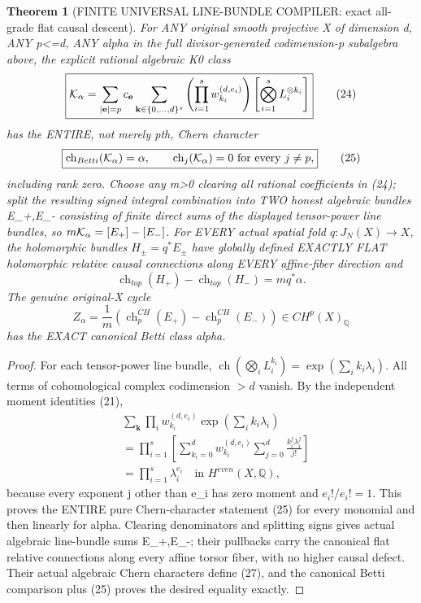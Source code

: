 \documentclass[11pt]{article}
\newtheorem{theorem}{Theorem}
\begin{document}
\begin{theorem}[FINITE UNIVERSAL LINE-BUNDLE COMPILER: exact all-grade flat causal descent]
For ANY original smooth projective X
of dimension d, ANY p<=d, ANY
alpha in the full divisor-generated
codimension-p subalgebra above,
the explicit rational algebraic K0
class
\[
 \boxed{
 {\cal K}_\alpha
 =\sum_{|\mathbf e|=p}
 c_{\mathbf e}
 \sum_{\mathbf k\in\{0,\dots,d\}^s}
 \left(\prod_{i=1}^s w_{k_i}^{(d,e_i)}\right)
 \left[
    \bigotimes_{i=1}^s L_i^{\otimes k_i}
 \right]
 }                                                       \tag{24}
\]
has the ENTIRE, not merely pth,
Chern character
\[
 \boxed{\operatorname{ch}_{Betti}({\cal K}_\alpha)
        =\alpha,\qquad
   \operatorname{ch}_j({\cal K}_\alpha)=0
     \text{ for every }j\ne p,
 }                                                       \tag{25}
\]
including rank zero.
Choose any m>0 clearing
all rational coefficients
in (24); split the resulting
signed integral combination
into TWO honest algebraic
bundles E_+,E_- consisting
of finite direct sums of the
displayed tensor-power line bundles,
so $m{\cal K}_\alpha=[E_+]-[E_-]$.
For EVERY actual spatial fold
$q:J_N(X)\to X$, the holomorphic
bundles $H_\pm=q^*E_\pm$
have globally defined EXACTLY
FLAT holomorphic relative
causal connections along EVERY
affine-fiber direction and
\[
 \operatorname{ch}_{top}(H_+)
  -\operatorname{ch}_{top}(H_-)=m q^*\alpha.
 \tag{26}
\]
The genuine original-X cycle
\[
 \boxed{
 Z_\alpha=
  \frac1m\left(
     \operatorname{ch}_p^{CH}(E_+)
      -\operatorname{ch}_p^{CH}(E_-)\right)
       \in CH^p(X)_\mathbb Q
 }                                                       \tag{27}
\]
has the EXACT canonical
Betti class alpha.
\end{theorem}
\begin{proof}
For each tensor-power line bundle,
$\operatorname{ch}(\bigotimes_i L_i^{k_i})
=\exp(\sum_i k_i\lambda_i)$.
All terms of cohomological
complex codimension $>d$ vanish.
By the independent moment
identities (21),
\[
\begin{aligned}
 &\sum_{\mathbf k}
   \prod_i w_{k_i}^{(d,e_i)}
      \exp\left(\sum_i k_i\lambda_i\right)\\
 &=\prod_{i=1}^s
    \left[\sum_{k_i=0}^d
      w_{k_i}^{(d,e_i)}
         \sum_{j=0}^d
           \frac{k_i^j\lambda_i^j}{j!}\right]\\
 &=\prod_{i=1}^s\lambda_i^{e_i}
 \quad\text{in }H^{even}(X,\mathbb Q),
\end{aligned}                                                \tag{28}
\]
because every exponent j other
than e_i has zero moment and
$e_i!/e_i!=1$.
This proves the ENTIRE
pure Chern-character statement
(25) for every monomial and
then linearly for alpha.
Clearing denominators and
splitting signs gives actual
algebraic line-bundle sums
E_+,E_-; their pullbacks
carry the canonical flat
relative connections along
every affine torsor fiber,
with no higher causal defect.
Their actual algebraic Chern
characters define (27),
and the canonical Betti comparison
plus (25) proves the desired
equality exactly.
\end{proof}
\end{document}
